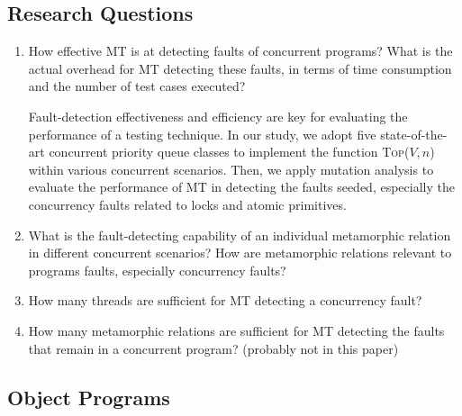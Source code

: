 \documentclass[conference]{IEEEtran}
\theoremstyle{remark}
\newcommand{\Fn}{\textsc{Top}}
\begin{document}
\subsection{Research Questions}
\label{section:questions}

\begin{enumerate}[RQ-1]
\item

How effective MT is at detecting faults of concurrent programs? What is the actual overhead for MT detecting these faults, in terms of time consumption and the number of test cases executed?

Fault-detection effectiveness and efficiency are key for evaluating the performance of a testing technique. In our study, we adopt five state-of-the-art concurrent priority queue classes to implement the function \Fn($V,n$) within various concurrent scenarios. Then, we apply mutation analysis to evaluate the performance of MT in detecting the faults seeded, especially the concurrency faults related  to locks and atomic primitives.
\item
What is the fault-detecting capability of an individual metamorphic relation in different concurrent scenarios? How are metamorphic relations relevant to programs faults, especially concurrency faults?

\item
How many threads are sufficient for MT detecting a concurrency fault? 

\item
How many metamorphic relations are sufficient for MT detecting the faults that remain in a concurrent program? ({\color{red}probably not in this paper})

\end{enumerate}

\subsection{Object Programs}
\label{sec:programs}
\end{document}
